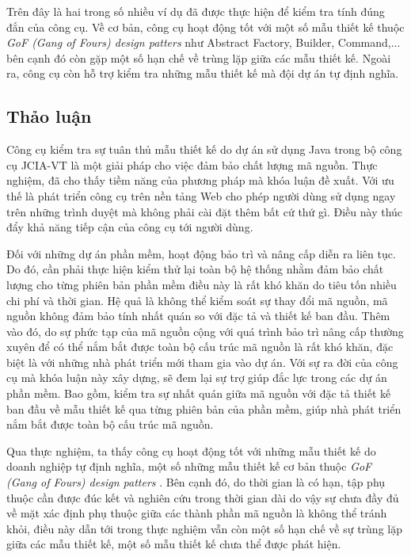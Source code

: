 \documentclass[12pt]{report}
\begin{document}
\noindent Trên đây là hai trong số nhiều ví dụ đã được thực hiện để kiểm tra tính đúng đắn của công cụ. Về cơ bản, công cụ hoạt động tốt với một số mẫu thiết kế thuộc \textit{GoF (Gang of Fours) design patters} \cite{go4} như Abstract Factory, Builder, Command,... bên cạnh đó còn gặp một số hạn chế về trùng lặp giữa các mẫu thiết kế.
Ngoài ra, công cụ còn hỗ trợ kiểm tra những mẫu thiết kế mà đội dự án tự định nghĩa. 

\subsection{Thảo luận}
Công cụ kiểm tra sự tuân thủ mẫu thiết kế do dự án sử dụng Java trong bộ công cụ JCIA-VT là một giải pháp cho việc đảm bảo chất lượng mã nguồn. Thực nghiệm, đã cho thấy tiềm năng của phương pháp mà khóa luận đề xuất. Với ưu thế là phát triển công cụ trên nền tảng Web cho phép người dùng sử dụng ngay trên những trình duyệt mà không phải cài đặt thêm bất cứ thứ gì. Điều này thúc đẩy khả năng tiếp cận của công cụ tới người dùng.

\noindent Đối với những dự án phần mềm, hoạt động bảo trì và nâng cấp diễn ra liên tục. Do đó, cần phải thực hiện kiểm thử lại toàn bộ hệ thống nhằm đảm bảo chất lượng cho từng phiên bản phần mềm điều này là rất khó khăn do tiêu tốn nhiều chi phí và thời gian. Hệ quả là không thể kiểm soát sự thay đổi mã nguồn, mã nguồn không đảm bảo tính nhất quán so với đặc tả và thiết kế ban đầu. Thêm vào đó, do sự phức tạp của mã nguồn cộng với quá trình bảo trì nâng cấp thường xuyên để có thể nắm bắt được toàn bộ cấu trúc mã nguồn là rất khó khăn, đặc biệt là với những nhà phát triển mới tham gia vào dự án. Với sự ra đời của công cụ mà khóa luận này xây dựng, sẽ đem lại sự trợ giúp đắc lực trong các dự án phần mềm. Bao gồm, kiểm tra sự nhất quán giữa mã nguồn với đặc tả thiết kế ban đầu về mẫu thiết kế qua từng phiên bản của phần mềm, giúp nhà phát triển nắm bắt được toàn bộ cấu trúc mã nguồn.

\noindent Qua thực nghiệm, ta thấy công cụ hoạt động tốt với những mẫu thiết kế do doanh nghiệp tự định nghĩa, một số những mẫu thiết kế cơ bản thuộc \textit{GoF (Gang of Fours) design patters} \cite{go4}. Bên cạnh đó, do thời gian là có hạn, tập phụ thuộc cần được đúc kết và nghiên cứu trong thời gian dài do vậy sự chưa đầy đủ về mặt xác định phụ thuộc giữa các thành phần mã nguồn là không thể tránh khỏi, điều này dẫn tới trong thực nghiệm vẫn còn một số hạn chế về sự trùng lặp giữa các mẫu thiết kế, một số mẫu thiết kế chưa thể được phát hiện.
\end{document}
